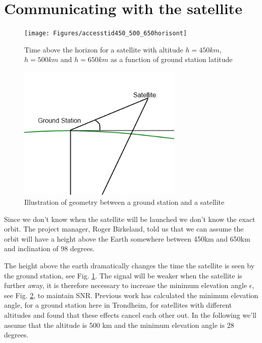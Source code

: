 \section{Communicating with the satellite}

\begin{figure}
  \begin{center}
    \texttt{[image: Figures/accesstid450\_500\_650horisont]}
  \end{center}
  \caption[LOS for 450 og 650]{Time above the horizon for a satellite with altitude $h=450km$, $h=500km$ and $h=650km$ as a function of ground station latitude}
  \label{fig:access_horizon}
\end{figure}

\begin{figure}
  \begin{center}
    \includegraphics[width=0.7\textwidth]{Figures/groundstation_satelitte_geometry}
  \end{center}
  \caption[Ground station satellite geometry]{Illustration of geometry between a ground station and a satellite}
  \label{fig:ground_station_satellite_geometry}
\end{figure}

Since we don't know when the satellite will be launched we don't know the exact orbit. The project manager, Roger Birkeland, told us that we can assume the orbit will  have a height above the Earth somewhere between 450km and 650km and inclination of 98 degrees.

The height above the earth dramatically changes the time the satellite is seen by the ground station, see Fig. \ref{fig:access_horizon}. The signal will be weaker when the satellite is further away, it is therefore necessary to increase the minimum elevation angle $\epsilon$, see Fig. \ref{fig:ground_station_satellite_geometry}, to maintain SNR.  Previous work\cite{antennemaster}\cite{bildemaster} has calculated the minimum elevation angle, for a ground station here in Trondheim, for satellites with different altitudes and found that these effects cancel each other out. In the following we'll assume that the altitude is 500 km and the minimum elevation angle is 28 degrees.

